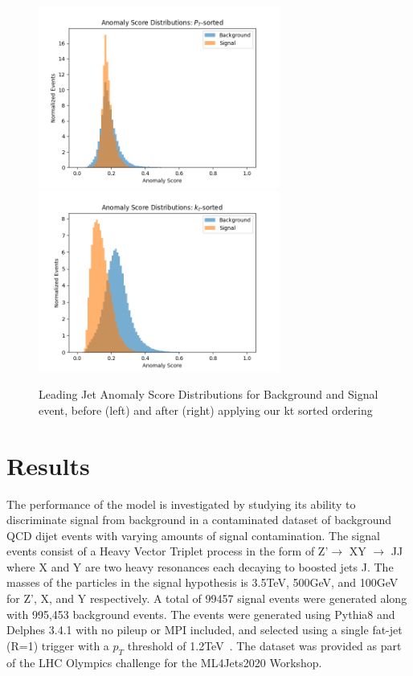 \documentclass[12pt, a4paper]{article}
\begin{document}
\begin{figure}[H]
	\begin{center}
		\includegraphics[width=225pt]{imgs/Anom_Score_CompPt.png}
		\includegraphics[width=225pt]{imgs/scorecomp.png}
	\end{center}
	\caption{Leading Jet Anomaly Score Distributions for Background and Signal event, before (left) and after (right) applying our kt sorted ordering}
	\label{fig:score_comp}
\end{figure}



\section{Results}

The performance of the model is investigated by studying its ability to discriminate signal from background in a contaminated dataset of background QCD dijet events with varying amounts of signal contamination. The signal events consist of a Heavy Vector Triplet process in the form of Z'$\rightarrow$ XY $\rightarrow$ JJ where X and Y are two heavy resonances each decaying to boosted jets J. The masses of the particles in the signal hypothesis is 3.5TeV, 500GeV, and 100GeV for Z', X, and Y respectively. A total of 99457 signal events were generated along with 995,453 background events. The events were generated using {\sc Pythia8} and {\sc Delphes 3.4.1} with no pileup or MPI included, and selected using a single fat-jet (R=1) trigger with a $p_T$ threshold of 1.2TeV~\cite{dataset}. The dataset was provided as part of the LHC Olympics challenge for the ML4Jets2020 Workshop. 
\end{document}
